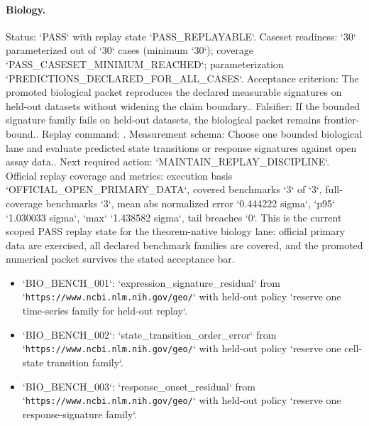\paragraph{Biology.}
Status: `PASS` with replay state `PASS\_REPLAYABLE`.
Caseset readiness: `30` parameterized out of `30` cases (minimum `30`); coverage `PASS\_CASESET\_MINIMUM\_REACHED`; parameterization `PREDICTIONS\_DECLARED\_FOR\_ALL\_CASES`.
Acceptance criterion: The promoted biological packet reproduces the declared measurable signatures on held-out datasets without widening the claim boundary..
Falsifier: If the bounded signature family fails on held-out datasets, the biological packet remains frontier-bound..
Replay command: .
Measurement schema: Choose one bounded biological lane and evaluate predicted state transitions or response signatures against open assay data..
Next required action: `MAINTAIN\_REPLAY\_DISCIPLINE`.
Official replay coverage and metrics: execution basis `OFFICIAL\_OPEN\_PRIMARY\_DATA`, covered benchmarks `3` of `3`, full-coverage benchmarks `3`, mean abs normalized error `0.444222 sigma`, `p95` `1.030033 sigma`, `max` `1.438582 sigma`, tail breaches `0`.
This is the current scoped PASS replay state for the theorem-native biology
lane: official primary data are exercised, all declared benchmark families are
covered, and the promoted numerical packet survives the stated acceptance bar.
\begin{itemize}
\item `BIO\_BENCH\_001`: `expression\_signature\_residual` from `\texttt{https://www.ncbi.nlm.nih.gov/geo/}` with held-out policy `reserve one time-series family for held-out replay`.
\item `BIO\_BENCH\_002`: `state\_transition\_order\_error` from `\texttt{https://www.ncbi.nlm.nih.gov/geo/}` with held-out policy `reserve one cell-state transition family`.
\item `BIO\_BENCH\_003`: `response\_onset\_residual` from `\texttt{https://www.ncbi.nlm.nih.gov/geo/}` with held-out policy `reserve one response-signature family`.
\end{itemize}

